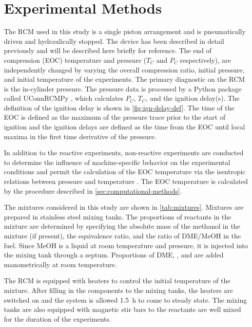 \documentclass[12pt]{../ussci}
\begin{document}
\section{Experimental Methods}\label{sec:experimental-methods}

The RCM used in this study is a single piston arrangement and is pneumatically
driven and hydraulically stopped. The device has been described in detail
previously \autocite{Mittal2007a} and will be described here briefly for
reference. The end of compression (EOC) temperature and pressure (\(T_C\) and
\(P_C\) respectively), are independently changed by varying the overall
compression ratio, initial pressure, and initial temperature of the experiments.
The primary diagnostic on the RCM is the in-cylinder pressure. The pressure data
is processed by a Python package called UConnRCMPy \autocite{uconnrcmpy}, which
calculates \(P_C\), \(T_C\), and the ignition delay(s). The definition of the
ignition delay is shown in \cref{fig:ign-delay-def}. The time of the EOC is
defined as the maximum of the pressure trace prior to the start of ignition and
the ignition delays are defined as the time from the EOC until local maxima in
the first time derivative of the pressure.

In addition to the reactive experiments, non-reactive experiments are conducted
to determine the influence of machine-specific behavior on the experimental
conditions and permit the calculation of the EOC temperature via the isentropic
relations between pressure and temperature \autocite{Lee1998}. The EOC
temperature is calculated by the procedure described in
\cref{sec:computational-methods}.

The mixtures considered in this study are shown in \cref{tab:mixtures}. Mixtures
are prepared in stainless steel mixing tanks. The proportions of reactants in
the mixture are determined by specifying the absolute mass of the methanol in
the mixture (if present), the equivalence ratio, and the ratio of DME/MeOH in
the fuel. Since MeOH is a liquid at room temperature and pressure, it is
injected into the mixing tank through a septum. Proportions of DME, , and
 are added manometrically at room temperature.

The RCM is equipped with heaters to control the initial temperature of the
mixture. After filling in the components to the mixing tanks, the heaters are
switched on and the system is allowed \SI{1.5}{\hour} to come to steady state.
The mixing tanks are also equipped with magnetic stir bars to the reactants are
well mixed for the duration of the experiments.
\end{document}
